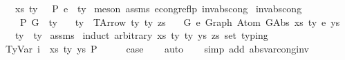 \begin{isabellebody}
\ \ \ {\isachardoublequoteopen}{\isacharparenleft}{\kern0pt}xs{\isacharcomma}{\kern0pt}\ ty{}{\isacharparenright}{\kern0pt}\ {\isacharhash}{\kern0pt}\ {\isasymGamma}\ {\isasymturnstile}{\isacharbraceleft}{\kern0pt}P{\isacharbraceright}{\kern0pt}\ e\ {\isacharcolon}{\kern0pt}\ ty{}{\isachardoublequoteclose}\isanewline
%
\isadelimproof
%
\endisadelimproof
%
\isatagproof
{}\isamarkupfalse%
\ {\isacharparenleft}{\kern0pt}meson\ assms\ econg{\isacharunderscore}{\kern0pt}reflp\ inv{\isacharunderscore}{\kern0pt}abs{\isacharunderscore}{\kern0pt}cong{}{\isacharparenright}{\kern0pt}%
\endisatagproof
{\isafoldproof}%
%
\isadelimproof
\isanewline
%
\endisadelimproof
\isanewline
\isanewline
{}\isamarkupfalse%
\ inv{\isacharunderscore}{\kern0pt}abs{\isacharunderscore}{\kern0pt}cong{}{\isacharcolon}{\kern0pt}\isanewline
\ \ \ {\isachardoublequoteopen}{\isasymGamma}\ {\isasymturnstile}{\isacharbraceleft}{\kern0pt}P{\isacharbraceright}{\kern0pt}\ G\ {\isacharcolon}{\kern0pt}\ ty{\isachardoublequoteclose}\isanewline
\ \ \ {\isachardoublequoteopen}ty\ {\isacharequal}{\kern0pt}\ TArrow\ ty{}{\isacharprime}{\kern0pt}\ ty{}\ zs{\isachardoublequoteclose}\isanewline
\ \ \ {\isachardoublequoteopen}G\ {\isasymsimeq}e\ Graph\ {\isacharparenleft}{\kern0pt}Atom\ {\isacharparenleft}{\kern0pt}GAbs\ xs\ ty{}\ e{\isacharparenright}{\kern0pt}\ ys{\isacharparenright}{\kern0pt}{\isachardoublequoteclose}\isanewline
\ \ \ {\isachardoublequoteopen}ty{}\ {\isacharequal}{\kern0pt}\ ty{}{\isacharprime}{\kern0pt}{\isachardoublequoteclose}\isanewline
%
\isadelimproof
%
\endisadelimproof
%
\isatagproof
{}\isamarkupfalse%
\ assms\isanewline
{}\isamarkupfalse%
\ {\isacharparenleft}{\kern0pt}induct\ arbitrary{\isacharcolon}{\kern0pt}\ xs\ ty{}\ ty{}{\isacharprime}{\kern0pt}\ ys\ zs\ set{\isacharcolon}{\kern0pt}\ typing{\isacharparenright}{\kern0pt}\isanewline
\ \ \isamarkupfalse%
\ {\isacharparenleft}{\kern0pt}TyVar\ i\ {\isasymGamma}\ xs\ ty\ ys\ P{\isacharparenright}{\kern0pt}\isanewline
\ \ \isamarkupfalse%
\ \isamarkupfalse%
\ {\isacharquery}{\kern0pt}case\isanewline
\ \ \isamarkupfalse%
\ auto\isanewline
\ \ \isamarkupfalse%
\ {\isacharparenleft}{\kern0pt}simp\ add{\isacharcolon}{\kern0pt}\ abs{\isacharunderscore}{\kern0pt}var{\isacharunderscore}{\kern0pt}cong{\isacharunderscore}{\kern0pt}inv{\isacharparenright}{\kern0pt}\isanewline

\end{isabellebody}

